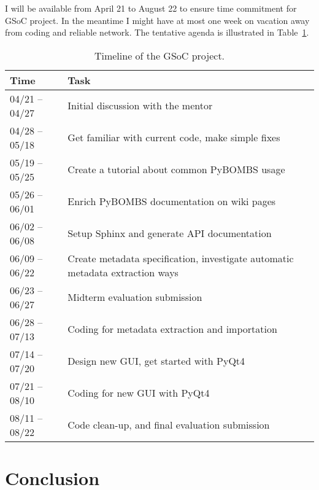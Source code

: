 \documentclass[a4paper]{article}
\begin{document}
I will be available from April 21 to August 22 to ensure time
commitment for GSoC project. In the meantime I might have at most one week on
vacation away from coding and reliable network. The tentative agenda is
illustrated in Table~\ref{tab:timeline}.

\begin{table}[htbp]
  \centering
  \begin{tabular}{lp{}}
    \hline
    Time & Task \\
    \hline
    04/21 -- 04/27 & Initial discussion with the mentor \\
    04/28 -- 05/18 & Get familiar with current code, make simple fixes \\
    05/19 -- 05/25 & Create a tutorial about common PyBOMBS usage\\
    05/26 -- 06/01 & Enrich PyBOMBS documentation on wiki pages \\
    06/02 -- 06/08 & Setup Sphinx and generate API documentation \\
    06/09 -- 06/22 & Create metadata specification, investigate
    automatic metadata extraction ways\\
    06/23 -- 06/27 & Midterm evaluation submission\\
    06/28 -- 07/13 & Coding for metadata extraction and importation \\
    07/14 -- 07/20 & Design new GUI, get started with PyQt4 \\
    07/21 -- 08/10 & Coding for new GUI with PyQt4 \\
    08/11 -- 08/22 & Code clean-up, and final evaluation submission \\
    \hline
  \end{tabular}
  \caption{Timeline of the GSoC project.}
  \label{tab:timeline}
\end{table}

\section{Conclusion}
\end{document}
